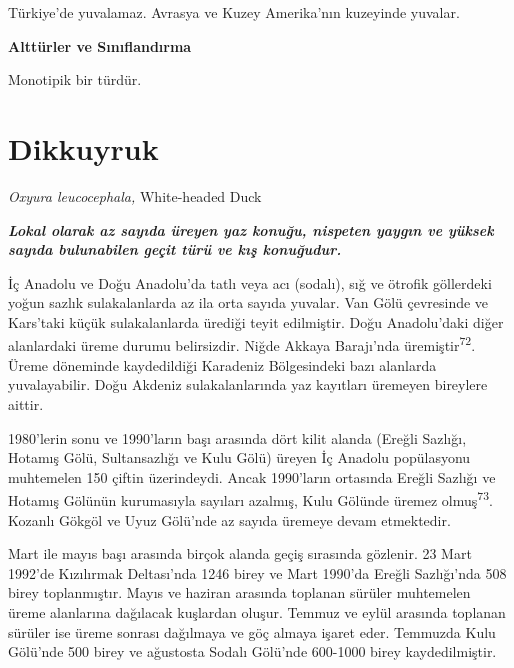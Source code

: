 \documentclass[
  letterpaper,
  DIV=11,
  numbers=noendperiod]{scrreprt}
\begin{document}
Türkiye'de yuvalamaz. Avrasya ve Kuzey Amerika'nın kuzeyinde yuvalar.

\textbf{Alttürler ve Sınıflandırma}

Monotipik bir türdür.

\hypertarget{sec-dikkuyruk}{%
\section{Dikkuyruk}\label{sec-dikkuyruk}}

\emph{Oxyura leucocephala,} White-headed Duck

\textbf{\emph{Lokal olarak az sayıda üreyen yaz konuğu, nispeten yaygın
ve yüksek sayıda bulunabilen geçit türü ve kış konuğudur.}}

İç Anadolu ve Doğu Anadolu'da tatlı veya acı (sodalı), sığ ve ötrofik
göllerdeki yoğun sazlık sulakalanlarda az ila orta sayıda yuvalar. Van
Gölü çevresinde ve Kars'taki küçük sulakalanlarda ürediği teyit
edilmiştir. Doğu Anadolu'daki diğer alanlardaki üreme durumu
belirsizdir. Niğde Akkaya Barajı'nda üremiştir\textsuperscript{72}.
Üreme döneminde kaydedildiği Karadeniz Bölgesindeki bazı alanlarda
yuvalayabilir. Doğu Akdeniz sulakalanlarında yaz kayıtları üremeyen
bireylere aittir.

1980'lerin sonu ve 1990'ların başı arasında dört kilit alanda (Ereğli
Sazlığı, Hotamış Gölü, Sultansazlığı ve Kulu Gölü) üreyen İç Anadolu
popülasyonu muhtemelen 150 çiftin üzerindeydi. Ancak 1990'ların
ortasında Ereğli Sazlığı ve Hotamış Gölünün kurumasıyla sayıları
azalmış, Kulu Gölünde üremez olmuş\textsuperscript{73}. Kozanlı Gökgöl
ve Uyuz Gölü'nde az sayıda üremeye devam etmektedir.

Mart ile mayıs başı arasında birçok alanda geçiş sırasında gözlenir. 23
Mart 1992'de Kızılırmak Deltası'nda 1246 birey ve Mart 1990'da Ereğli
Sazlığı'nda 508 birey toplanmıştır. Mayıs ve haziran arasında toplanan
sürüler muhtemelen üreme alanlarına dağılacak kuşlardan oluşur. Temmuz
ve eylül arasında toplanan sürüler ise üreme sonrası dağılmaya ve göç
almaya işaret eder. Temmuzda Kulu Gölü'nde 500 birey ve ağustosta Sodalı
Gölü'nde 600-1000 birey kaydedilmiştir.
\end{document}
